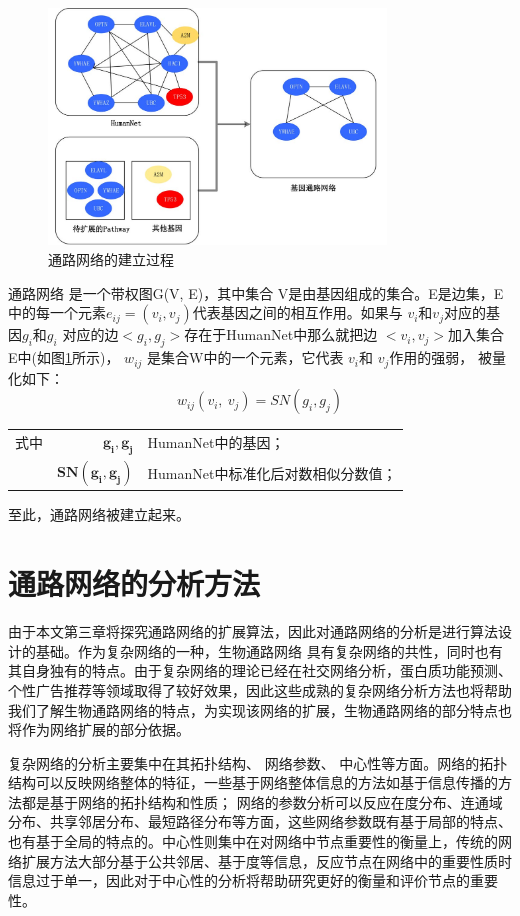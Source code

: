 \begin{figure}
\centering
\includegraphics[width = 0.8\textwidth]{pathway_cons}
\caption[fig21]{通路网络的建立过程}
\label{fig21}
\end{figure}
通路网络 是一个带权图G(V, E)，其中集合 V是由基因组成的集合。E是边集，E中的每一个元素$e_{ij}=(v_{i}, v_{j})$代表基因之间的相互作用。如果与 $v_{i}$和$v_{j}$对应的基因$g_{i}$和$g_{i}$ 对应的边$< g_{i} ,g_{j}  >$存在于HumanNet中那么就把边 $< v_{i} ,v_{j}  >$加入集合E中(如图\ref{fig21}所示)， $w_{ij}$ 是集合W中的一个元素，它代表 $v_{i}$和 $v_{j}$作用的强弱， 被量化如下：
\begin{equation}\label{eq22}
w_{ij} ( v_{i} ,\ v_{j}) =SN( g_{i} ,g_{j})
\end{equation}
\begin{tabularx}{\textwidth}{@{}l@{\quad}r@{———}X@{}}
式中 & $\boldsymbol{ g_{i}, g_{j}}$ &HumanNet中的基因；\\
	& $\boldsymbol{SN( g_{i} ,g_{j})}$ & HumanNet中标准化后对数相似分数值；\\
\end{tabularx}\vspace{3.15bp}
至此，通路网络被建立起来。


\section{ 通路网络的分析方法}
由于本文第三章将探究通路网络的扩展算法，因此对通路网络的分析是进行算法设计的基础。作为复杂网络的一种，生物通路网络
具有复杂网络的共性，同时也有其自身独有的特点。由于复杂网络的理论已经在社交网络分析，蛋白质功能预测、个性广告推荐等领域取得了较好效果，因此这些成熟的复杂网络分析方法也将帮助我们了解生物通路网络的特点，为实现该网络的扩展，生物通路网络的部分特点也将作为网络扩展的部分依据。

复杂网络的分析主要集中在其拓扑结构、 网络参数、 中心性等方面。网络的拓扑结构可以反映网络整体的特征，一些基于网络整体信息的方法如基于信息传播的方法\cite{}都是基于网络的拓扑结构和性质； 网络的参数分析可以反应在度分布、连通域分布、共享邻居分布、最短路径分布等方面，这些网络参数既有基于局部的特点、也有基于全局的特点的。中心性则集中在对网络中节点重要性的衡量上，传统的网络扩展方法大部分基于公共邻居、基于度\cite{}等信息，反应节点在网络中的重要性质时信息过于单一，因此对于中心性的分析将帮助研究更好的衡量和评价节点的重要性。

